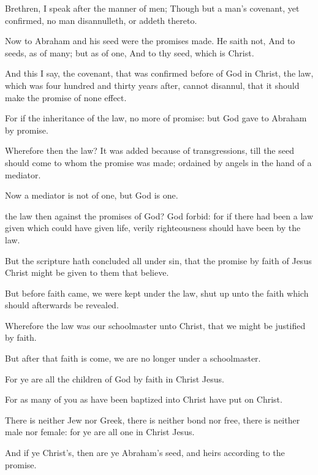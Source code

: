 {Brethren, I
speak after the manner
of
men;
Though
{}
but a
man’s
covenant, yet
{}
confirmed, no
man
disannulleth,
or addeth
thereto.

Now to
Abraham
and
his
seed
were the
promises
made. He
saith
not,
And to
seeds,
as
of
many;
but
as
of
one,
And
to
thy
seed,
which
is
Christ.

And
this I
say,
{} the
covenant, that was confirmed
before
of
God
in
Christ, the
law,
which
was four
hundred
and
thirty
years
after,
cannot
disannul,
that it should
make the
promise of none
effect.

For
if the
inheritance
{}
of the
law,
{} no
more
of
promise:
but
God
gave
{} to
Abraham
by
promise.

Wherefore
then
{} the
law? It was
added
because of
transgressions,
till the
seed should
come to
whom the promise was
made;
{}
ordained
by
angels
in the
hand of a
mediator.

Now a
mediator
is
not
{} of
one,
but
God
is
one.

 the
law
then
against the
promises of
God? God
forbid:
for
if there had
been a
law
given
which could
have given
life,
verily
righteousness should have
been
by the
law.

But the
scripture hath
concluded
all
under
sin,
that the
promise
by
faith of
Jesus
Christ might be
given to them
that
believe.


\par }{\PP {}But
before
faith
came, we were
kept
under the
law, shut
up
unto the
faith
which should
afterwards be
revealed.

Wherefore the
law
was
our
schoolmaster
{}
unto
Christ,
that we might be
justified
by
faith.

But after
that
faith is
come, we
are no
longer
under a
schoolmaster.

For ye
are
all the
children of
God
by
faith
in
Christ
Jesus.

For as
many of
you
as have been
baptized
into
Christ have put
on
Christ.

There
is
neither
Jew
nor
Greek, there
is
neither
bond
nor
free, there
is
neither
male
nor
female:
for
ye
are
all
one
in
Christ
Jesus.

And
if
ye
{}
Christ’s,
then are
ye
Abraham’s
seed,
and
heirs according
to the
promise.




}
